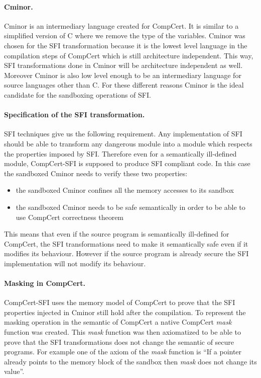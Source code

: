 \documentclass[11pt]{sdm}
\begin{document}
\paragraph{Cminor.}
\label{par:Cminor}

Cminor is an intermediary language created for CompCert. It is similar to a simplified version of C where we remove the type of the variables. Cminor was chosen for the SFI transformation because it is the lowest level language in the compilation steps of CompCert which is still architecture independent. This way, SFI transformations done in Cminor will be architecture independent as well. Moreover Cminor is also low level enough to be an intermediary language for source languages other than C. For these different reasons Cminor is the ideal candidate for the sandboxing operations of SFI.

\paragraph{Specification of the SFI transformation.}
\label{par:Specification of the SFI tranformation}
SFI techniques give us the following requirement. Any implementation of SFI should be able to transform any dangerous module into a module which respects the properties imposed by SFI. Therefore even for a semantically ill-defined module, CompCert-SFI is supposed to produce SFI compliant code.
In this case the sandboxed Cminor needs to verify these two properties:
\begin{itemize}
	\item the sandboxed Cminor confines all the memory accesses to its sandbox
	\item the sandboxed Cminor needs to be safe semantically in order to be able to use CompCert correctness theorem
\end{itemize}

This means that even if the source program is semantically ill-defined for CompCert, the SFI transformations need to make it semantically safe even if it modifies its behaviour.
However if the source program is already secure the SFI implementation will not modify its behaviour.

\paragraph{Masking in CompCert.}
\label{par:Masking in CompCert}
CompCert-SFI uses the memory model of CompCert to prove that the SFI properties injected in Cminor still hold after the compilation. To represent the masking operation in the semantic of CompCert a native CompCert \textit{mask} function was created. This \textit{mask} function was then axiomatized to be able to prove that the SFI transformations does not change the semantic of secure programs.
For example one of the axiom of the \textit{mask} function is ``If a pointer already points to the memory block of the sandbox then \textit{mask} does not change its value''.
\end{document}
